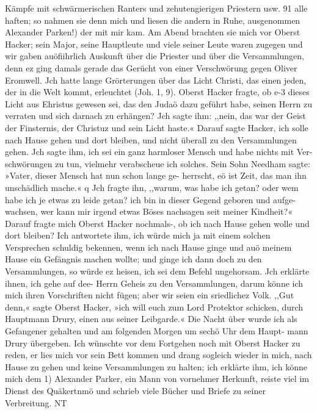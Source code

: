 Kämpfe mit schwärmerischen Ranters und zehutengierigen Priestern usw. 91
alle haften; so nahmen sie denn mich und liesen die andern in
Ruhe, ausgenommen Alexander Parken!) der mit mir kam. Am
Abend brachten sie mich vor Oberst Hacker; sein Major, seine
Hauptleute und viele seiner Leute waren zugegen und wir gaben
auöfiihrlich Auskunft über die Priester und über die Versammlungen,
denn ez ging damals gerade das Gerücht von einer Verschwörung
gegen Oliver Eromwell. Jch hatte lange Grörterungen über das
Licht Christi, das einen jeden, der in die Welt kommt, erleuchtet
(Joh. 1, 9). Oberst Hacker fragte, ob e-3 dieses Licht aus Ehristus
gewesen sei, das den Judaö dazu geführt habe, seinen Herrn zu
verraten und sich darnach zu erhängen? Jch sagte ihm: ,,nein,
das war der Geist der Finsternis, der Christuz und sein Licht
haste.« Darauf sagte Hacker, ich solle nach Hause gehen und dort
bleiben, und nicht überall zu den Versammlungen gehen. Jch sagte
ihm, ich sei ein ganz harmloser Mensch und habe nichts mit Ver-
schwörungen zu tun, vielmehr verabscheue ich solches. Sein Sohn
Needham sagte: »Vater, dieser Mensch hat nun schon lange ge-
herrscht, eö ist Zeit, das man ihn unschädlich mache.« q Jch fragte
ihn, ,,warum, was habe ich getan? oder wem habe ich je etwas
zu leide getan? ich bin in dieser Gegend geboren und aufge-
wachsen, wer kann mir irgend etwas Böses nachsagen seit meiner
Kindheit?« Darauf fragte mich Oberst Hacker nochmals-, ob ich
nach Hause gehen wolle und dort bleiben? Ich antwortete ihm,
ich würde mich ja mit einem solchen Versprechen schuldig bekennen,
wenn ich nach Hause ginge und auö meinem Hause ein Gefängnis
machen wollte; und ginge ich dann doch zu den Versammlungen, so
würde ez heisen, ich sei dem Befehl ungehorsam. Jch erklärte
ihnen, ich gehe auf dee- Herrn Geheis zu den Versammlungen,
darum könne ich mich ihren Vorschriften nicht fügen; aber wir
seien ein sriedlichez Volk. ,,Gut denn,« sagte Oberst Hacker, »ich will
euch zum Lord Protektor schicken, durch Hauptmann Drury, einen
aus seiner Leibgarde.« Die Nacht über wurde ich als Gefangener
gehalten und am folgenden Morgen um sechö Uhr dem Haupt-
mann Drury übergeben. Ich wünschte vor dem Fortgehen noch
mit Oberst Hacker zu reden, er lies mich vor sein Bett kommen und
drang sogleich wieder in mich, nach Hause zu gehen und keine
Versammlungen zu halten; ich erklärte ihm, ich könne mich dem
1) Alexander Parker, ein Mann von vornehmer Herkunft, reiste viel im
Dienst des Quäkertnmö und schrieb viele Bücher und Briefe zu seiner Verbreitung. NT


